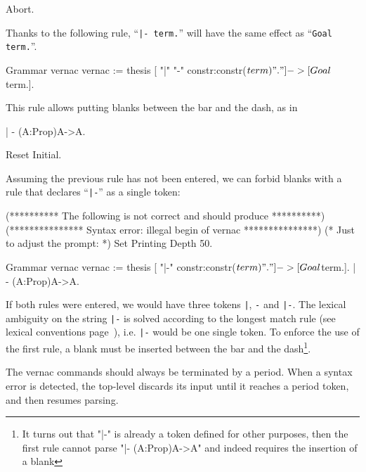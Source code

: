 {\begin{coq_eval}
Abort.
\end{coq_eval}


Thanks to the following rule, ``{\tt |- term.}'' will have the same
effect as ``{\tt Goal term.}''.

\begin{coq_example}
Grammar vernac vernac := 
  thesis [ "|" "-" constr:constr($term) "." ]
          -> [Goal $term.].
\end{coq_example}

\noindent This rule allows putting blanks between the bar and the
dash, as in

\begin{coq_example}
| - (A:Prop)A->A.
\end{coq_example}

\begin{coq_eval}
Reset Initial.
\end{coq_eval}

\noindent Assuming the previous rule has not been entered, we can
forbid blanks with a rule that declares ``\verb+|-+'' as a single
token:

\begin{coq_eval}
(********** The following is not correct and should produce **********)
(*************** Syntax error: illegal begin of vernac ***************)
(* Just to adjust the prompt: *) Set Printing Depth 50.
\end{coq_eval}
\begin{coq_example}
Grammar vernac vernac := 
  thesis [ "|-" constr:constr($term) "." ]
          -> [Goal $term.].
| - (A:Prop)A->A.
\end{coq_example}

\noindent If both rules were entered, we would have three tokens
\verb+|+, \verb+-+ and \verb+|-+. The lexical ambiguity on the string
\verb+|-+ is solved according to the longest match rule (see lexical
conventions page~\pageref{lexical}), i.e. \verb+|-+ would be one
single token. To enforce the use of the first rule, a blank must be
inserted between the bar and the dash\footnote{It turns out that "|-"
is already a token defined for other purposes, then the first rule
cannot parse "|- (A:Prop)A->A" and indeed requires the insertion of a blank}.


\Rem
The vernac commands should always be terminated by a period. When a
syntax error is detected, the top-level discards its input until it
reaches a period token, and then resumes parsing.

}
